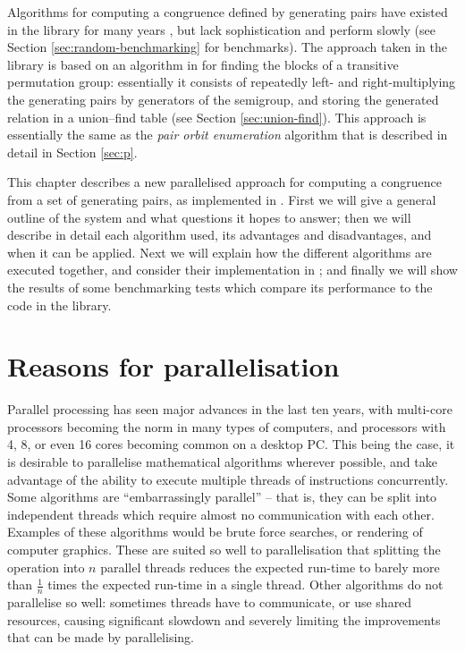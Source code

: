 Algorithms for computing a congruence defined by generating pairs have existed
in the \GAP{} library for many years \cite[\texttt{lib/mgmcong.gi}]{gap}, but
lack sophistication and perform slowly (see Section
\ref{sec:random-benchmarking} for benchmarks).  The approach taken in the
library is based on an algorithm in \cite{atkinson_1984} for finding the blocks
of a transitive permutation group: essentially it consists of repeatedly left-
and right-multiplying the generating pairs by generators of the semigroup, and
storing the generated relation in a union--find table (see Section
\ref{sec:union-find}).  This approach is essentially the same as the
\textit{pair orbit enumeration} algorithm that is described in detail in Section
\ref{sec:p}.

This chapter describes a new parallelised approach for computing a congruence
from a set of generating pairs, as implemented in \libsemigroups{}
\cite{libsemigroups}.  First we will give a general outline of the system and
what questions it hopes to answer; then we will describe in detail each
algorithm used, its advantages and disadvantages, and when it can be applied.
Next we will explain how the different algorithms are executed together, and
consider their implementation in \libsemigroups{}; and finally we will show the
results of some benchmarking tests which compare its performance to the code in
the \GAP{} library.

\section{Reasons for parallelisation}

Parallel processing has seen major advances in the last ten years, with
multi-core processors becoming the norm in many types of computers, and
processors with 4, 8, or even 16 cores becoming common on a desktop PC.  This
being the case, it is desirable to parallelise mathematical algorithms wherever
possible, and take advantage of the ability to execute multiple
threads of instructions concurrently.  Some algorithms
are ``embarrassingly parallel'' -- that is, they can be split into
independent threads which require almost no communication with each other.
Examples of these algorithms would be brute force searches, or rendering of
computer graphics.
These are suited so well to parallelisation that splitting the operation into
$n$ parallel threads reduces the expected run-time to barely more than
$\frac{1}{n}$ times the expected run-time in a single thread.  Other
algorithms do not parallelise so well: sometimes threads have to communicate, or
use shared resources, causing significant slowdown and severely limiting the
improvements that can be made by parallelising.


